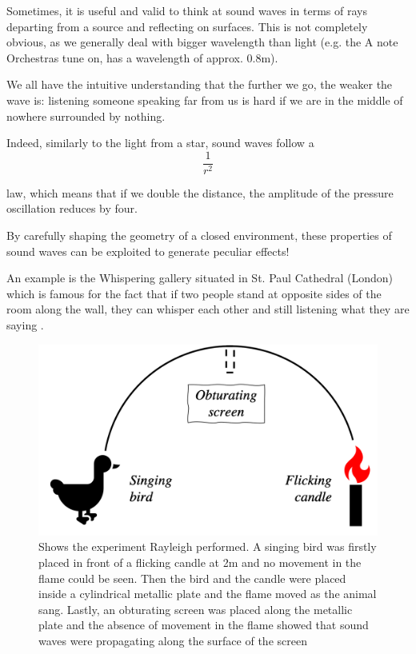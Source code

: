 \documentclass[a4paper]{article}
\begin{document}
Sometimes, it is useful and valid to think at sound waves in terms of rays departing from a source and reflecting on surfaces. This is not completely obvious, as we generally deal with bigger wavelength than light (e.g. the A note Orchestras tune on, has a wavelength of approx. 0.8m).

We all have the intuitive understanding that the further we go, the weaker the wave is: listening someone speaking far from us is hard if we are in the middle of nowhere surrounded by nothing.

Indeed, similarly to the light from a star, sound waves follow a
\begin{equation}
\frac{1}{r^2}
\end{equation}

law, which means that if we double the distance, the amplitude of the pressure oscillation reduces by four.

By carefully shaping the geometry of a closed environment, these properties of sound waves can be exploited to generate peculiar effects!

An example is the Whispering gallery situated in St. Paul Cathedral (London) which is famous for the fact that if two people stand at opposite sides of the room along the wall, they can whisper each other and still listening what they are saying \cite{article:whispering}.

\begin{figure}
\centering
\begin{tcolorbox}

\includegraphics[scale=0.28]{rayleigh_experiment}
\caption{ Shows the experiment Rayleigh performed. A singing bird was firstly placed in front of a flicking candle at 2m and no movement in the flame could be seen. Then the bird and the candle were placed inside a cylindrical metallic plate and the flame moved as the animal sang. Lastly, an obturating screen was placed along the metallic plate and the absence of movement in the flame showed that sound waves were propagating along the surface of the screen }
\label{fig:duck}

\end{tcolorbox}\par\bigskip
\end{figure}
\end{document}
